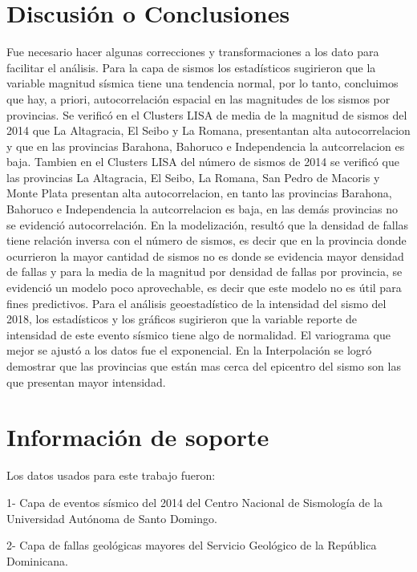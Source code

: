 \documentclass[11pt,]{article}
\begin{document}
\section{Discusión o Conclusiones}\label{discusiuxf3n-o-conclusiones}

Fue necesario hacer algunas correcciones y transformaciones a los dato
para facilitar el análisis. Para la capa de sismos los estadísticos
sugirieron que la variable magnitud sísmica tiene una tendencia normal,
por lo tanto, concluimos que hay, a priori, autocorrelación espacial en
las magnitudes de los sismos por provincias. Se verificó en el Clusters
LISA de media de la magnitud de sismos del 2014 que La Altagracia, El
Seibo y La Romana, presentantan alta autocorrelacion y que en las
provincias Barahona, Bahoruco e Independencia la autcorrelacion es baja.
Tambien en el Clusters LISA del número de sismos de 2014 se verificó que
las provincias La Altagracia, El Seibo, La Romana, San Pedro de Macoris
y Monte Plata presentan alta autocorrelacion, en tanto las provincias
Barahona, Bahoruco e Independencia la autcorrelacion es baja, en las
demás provincias no se evidenció autocorrelación. En la modelización,
resultó que la densidad de fallas tiene relación inversa con el número
de sismos, es decir que en la provincia donde ocurrieron la mayor
cantidad de sismos no es donde se evidencia mayor densidad de fallas y
para la media de la magnitud por densidad de fallas por provincia, se
evidenció un modelo poco aprovechable, es decir que este modelo no es
útil para fines predictivos. Para el análisis geoestadístico de la
intensidad del sismo del 2018, los estadísticos y los gráficos
sugirieron que la variable reporte de intensidad de este evento sísmico
tiene algo de normalidad. El variograma que mejor se ajustó a los datos
fue el exponencial. En la Interpolación se logró demostrar que las
provincias que están mas cerca del epicentro del sismo son las que
presentan mayor intensidad.

\section{Información de soporte}\label{informaciuxf3n-de-soporte}

Los datos usados para este trabajo fueron:

1- Capa de eventos sísmico del 2014 del Centro Nacional de Sismología de
la Universidad Autónoma de Santo Domingo.

2- Capa de fallas geológicas mayores del Servicio Geológico de la
República Dominicana.
\end{document}
